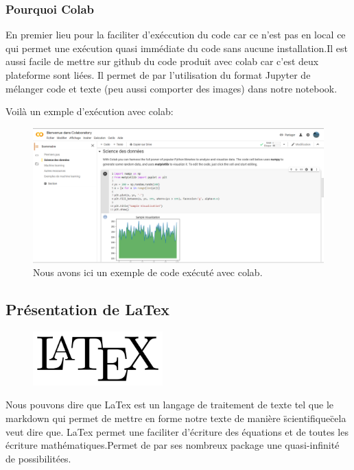 \subsubsection{Pourquoi Colab}
En premier lieu pour la faciliter d'exéccution du code car ce n'est pas en local ce qui permet une exécution quasi immédiate du code sans aucune installation.Il est aussi facile de mettre sur github du code produit avec colab car c'est deux plateforme sont liées. Il permet de par l'utilisation du format Jupyter de mélanger code et texte (peu aussi comporter des images) dans notre notebook.

Voilà un exmple d'exécution avec colab:

\begin{figure}[h]
\begin{center}
\includegraphics[width=15cm]{./images/Cap_colab.PNG}
\caption{Nous avons ici un exemple de code exécuté avec colab.}
\end{center}
\end{figure}


\subsection{Présentation de LaTex}

\begin{figure}[h]
  \begin{center}
\includegraphics[width=5cm]{./images/Latex.png}
\end{center}
\end{figure}

Nous pouvons dire que LaTex est un langage de traitement de texte tel que le markdown qui permet de mettre en forme notre texte de manière \"scientifique\" cela veut dire que. LaTex permet une faciliter d'écriture des équations et de toutes les écriture mathématiques.Permet de par ses nombreux package une quasi-infinité de possibilitées.
